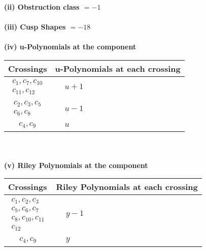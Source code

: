 \documentclass[1p]{elsarticle_modified}
\theoremstyle{definition}
\begin{document}
\flushleft \textbf{(ii) Obstruction class $= -1$}\\~\\
\flushleft \textbf{(iii) Cusp Shapes $= -18$}\\~\\
\newpage\renewcommand{\arraystretch}{1}
\flushleft \textbf{(iv) u-Polynomials at the component}\newline \\
\begin{tabular}{m{50pt}|m{274pt}}
Crossings & \hspace{64pt}u-Polynomials at each crossing \\
\hline $$\begin{aligned}c_{1},c_{7},c_{10}\\c_{11},c_{12}\end{aligned}$$&$\begin{aligned}
&u+1
\end{aligned}$\\
\hline $$\begin{aligned}c_{2},c_{3},c_{5}\\c_{6},c_{8}\end{aligned}$$&$\begin{aligned}
&u-1
\end{aligned}$\\
\hline $$\begin{aligned}c_{4},c_{9}\end{aligned}$$&$\begin{aligned}
&u
\end{aligned}$\\
\hline
\end{tabular}\\~\\
\newpage\renewcommand{\arraystretch}{1}
\flushleft \textbf{(v) Riley Polynomials at the component}\newline \\
\begin{tabular}{m{50pt}|m{274pt}}
Crossings & \hspace{64pt}Riley Polynomials at each crossing \\
\hline $$\begin{aligned}c_{1},c_{2},c_{3}\\c_{5},c_{6},c_{7}\\c_{8},c_{10},c_{11}\\c_{12}\end{aligned}$$&$\begin{aligned}
&y-1
\end{aligned}$\\
\hline $$\begin{aligned}c_{4},c_{9}\end{aligned}$$&$\begin{aligned}
&y
\end{aligned}$\\
\hline
\end{tabular}\\~\\
\end{document}
